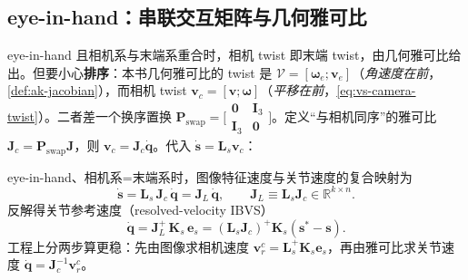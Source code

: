 \subsection{eye-in-hand：串联交互矩阵与几何雅可比}
\label{sec:vs-robot-eih}

eye-in-hand 且相机系与末端系重合时，相机 twist 即末端 twist，由几何雅可比给出。但要小心\textbf{排序}：本书几何雅可比的 twist 是 $\boldsymbol{\mathcal{V}}=[\boldsymbol{\omega}_e;\mathbf{v}_e]$（\emph{角速度在前}，\cref{def:ak-jacobian}），而相机 twist $\mathbf{v}_c=[\mathbf{v};\boldsymbol{\omega}]$（\emph{平移在前}，\cref{eq:vs-camera-twist}）。二者差一个换序置换 $\mathbf{P}_{\text{swap}}=\big[\begin{smallmatrix}\mathbf{0}&\mathbf{I}_3\\\mathbf{I}_3&\mathbf{0}\end{smallmatrix}\big]$。定义“与相机同序”的雅可比 $\mathbf{J}_c=\mathbf{P}_{\text{swap}}\mathbf{J}$，则 $\mathbf{v}_c=\mathbf{J}_c\dot{\mathbf{q}}$。代入 $\dot{\mathbf{s}}=\mathbf{L}_s\mathbf{v}_c$：

\begin{theorem}[视觉--关节复合映射]\label{thm:vs-LsJ}
eye-in-hand、相机系=末端系时，图像特征速度与关节速度的复合映射为
\begin{equation}
  \dot{\mathbf{s}}=\mathbf{L}_s\,\mathbf{J}_c\,\dot{\mathbf{q}}=\mathbf{J}_L\,\dot{\mathbf{q}},
  \qquad \mathbf{J}_L\equiv\mathbf{L}_s\mathbf{J}_c\in\mathbb{R}^{k\times n}.
  \label{eq:vs-JL}
\end{equation}
反解得关节参考速度（resolved-velocity IBVS）
\begin{equation}
  \boxed{\;\dot{\mathbf{q}}=\mathbf{J}_L^{+}\,\mathbf{K}_s\,\mathbf{e}_s=(\mathbf{L}_s\mathbf{J}_c)^{+}\mathbf{K}_s(\mathbf{s}^\ast-\mathbf{s}).\;}
  \label{eq:vs-resolved-joint}
\end{equation}
工程上分两步算更稳：先由图像求相机速度 $\mathbf{v}_r^c=\mathbf{L}_s^{+}\mathbf{K}_s\mathbf{e}_s$，再由雅可比求关节速度 $\dot{\mathbf{q}}=\mathbf{J}_c^{-1}\mathbf{v}_r^c$\cite{siciliano2009robotics}。
\end{theorem}

